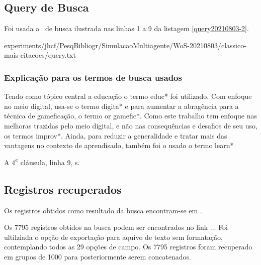 \subsection{Query de Busca}

Foi usada a \query\  de busca ilustrada nas linhas 1 a 9 da listagem \ref{query20210803-2}.


{experiments/jhcf/PesqBibliogr/SimulacaoMultiagente/WoS-20210803/classico-mais-citacoes/query.txt}

\subsubsection{Explicação para os termos de busca usados\label{}}



Tendo como tópico central a educação o termo educ*  foi utilizado. Com enfoque no meio digital, usa-se o termo digita* e para aumentar a abragência para  a técnica de gameficação, o termo or gamefic*. Como este trabalho tem enfoque nas melhoras trazidas pelo meio digital, e não nas consequências e desafios de seu uso, os termos improv*. Ainda, para reduzir a generalidade e tratar mais das vantagens no contexto de aprendisado, também foi o usado o termo learn*





A $4^{a}$ cláusula, linha 9,  s.

\subsection{Registros recuperados}

Os  registros obtidos como resultado da busca encontram-se em \url{}. 

Os 7795 registros obtidos na busca podem ser encontrados no link ...
Foi ultilziada o opção de exportação para aquivo de texto sem formatação, contemplando todos as 29 opções de campo. Os 7795 registros foram recuperado em grupos de 1000 para posteriormente serem concatenados.

